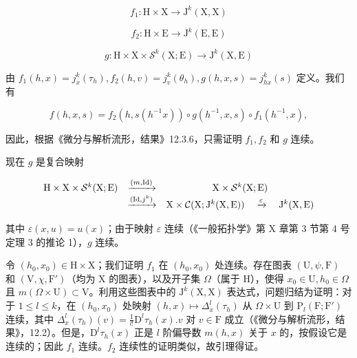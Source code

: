 \[
f _ {1}: \mathrm{H} \times \mathrm{X} \to \mathrm{J} ^ {k} (\mathrm{X}, \mathrm{X})
\]

\[
f _ {2}: \mathrm{H} \times \mathrm{E} \rightarrow \mathrm{J} ^ {k} (\mathrm{E}, \mathrm{E})
\]

\[
g: \mathrm{H} \times \mathrm{X} \times \mathcal {S} ^ {k} (\mathrm{X}; \mathrm{E}) \to \mathrm{J} ^ {k} (\mathrm{X}, \mathrm{E})
\]

由 \(f_{1}(h,x) = j_{x}^{k}(\tau_{h}),f_{2}(h,v) = j_{v}^{k}(\theta_{h}),g(h,x,s) = j_{hx}^{k}(s)\) 定义。我们有

\[
f (h, x, s) = f _ {2} (h, s (h ^ {- 1} x)) \circ g (h ^ {- 1}, x, s) \circ f _ {1} (h ^ {- 1}, x),
\]

因此，根据《微分与解析流形，结果》12.3.6，只需证明 \(f_{1}, f_{2}\) 和 \(g\) 连续。

现在 \(g\) 是复合映射

\[
\begin{array}{c c c} \mathrm{H} \times \mathrm{X} \times \mathcal {S} ^ {k} (\mathrm{X}; \mathrm{E}) & \xrightarrow {(m , \mathrm{Id})} & \mathrm{X} \times \mathcal {S} ^ {k} (\mathrm{X}; \mathrm{E}) \\ & \xrightarrow {(\mathrm{Id} , j ^ {k})} & \mathrm{X} \times \mathcal {C} (\mathrm{X}; \mathrm{J} ^ {k} (\mathrm{X}, \mathrm{E})) \quad \xrightarrow {\varepsilon} \quad \mathrm{J} ^ {k} (\mathrm{X}, \mathrm{E}) \end{array}
\]

其中 \(\varepsilon(x, u) = u(x)\)；由于映射 \(\varepsilon\) 连续（《一般拓扑学》第 X 章第 3 节第 4 号定理 3 的推论 1），\(g\) 连续。

令 \((h_{0}, x_{0}) \in \mathrm{H} \times \mathrm{X}\)；我们证明 \(f_{1}\) 在 \((h_{0}, x_{0})\) 处连续。存在图表 \((\mathrm{U}, \psi, \mathrm{F})\) 和 \((\mathrm{V}, \chi, \mathrm{F}')\)（均为 \(\mathrm{X}\) 的图表），以及开子集 \(\Omega\)（属于 \(\mathrm{H}\)），使得 \(x_{0} \in \mathrm{U}, h_{0} \in \Omega\) 且 \(m(\Omega \times \mathrm{U}) \subset \mathrm{V}\)。利用这些图表中的 \(\mathrm{J}^{k}(\mathrm{X}, \mathrm{X})\) 表达式，问题归结为证明：对于 \(1 \leq l \leq k\)，在 \((h_{0}, x_{0})\) 处映射 \((h, x) \mapsto \Delta_{x}^{l}(\tau_{h})\) 从 \(\Omega \times \mathrm{U}\) 到 \(\mathrm{P}_{l}(\mathrm{F}; \mathrm{F}')\) 连续，其中 \(\Delta_{x}^{l}(\tau_{h})(v) = \frac{1}{l!}\mathrm{D}^{l}\tau_{h}(x).v\) 对 \(v \in \mathrm{F}\) 成立（《微分与解析流形，结果》，12.2）。但是，\(\mathrm{D}^{l}\tau_{h}(x)\) 正是 \(l\) 阶偏导数 \(m(h, x)\) 关于 \(x\) 的，按假设它是连续的；因此 \(f_{1}\) 连续。\(f_{2}\) 连续性的证明类似，故引理得证。

